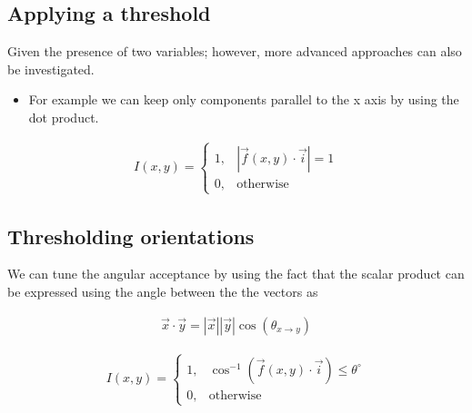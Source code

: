 \documentclass[letterpaper,10pt,english]{sphinxmanual}
\begin{document}
\noindent{}


\subsection{Applying a threshold}
\label{\detokenize{04-BasicSegmentation:applying-a-threshold}}
\sphinxAtStartPar
Given the presence of two variables; however, more advanced approaches can also be investigated.
\begin{itemize}
\item {} 
\sphinxAtStartPar
For example we can keep only components parallel to the x axis by using the dot product.

\end{itemize}
\begin{equation*}
\begin{split}I(x,y)=
\begin{cases}
1,&|\vec{f}(x,y)\cdot{}\vec{i}|=1\\
0,&\text{otherwise}
\end{cases}\end{split}
\end{equation*}

\subsection{Thresholding orientations}
\label{\detokenize{04-BasicSegmentation:thresholding-orientations}}
\sphinxAtStartPar
We can tune the angular acceptance by using the fact that the scalar product can be expressed using the angle between the the vectors as

\sphinxAtStartPar
{}
\begin{equation*}
\begin{split}\vec{x}\cdot\vec{y}=|\vec{x}| |\vec{y}| \cos(\theta_{x\rightarrow y}) \end{split}
\end{equation*}

\begin{equation*}
\begin{split}I(x,y)=
\begin{cases}
1,&\cos^{-1}(\vec{f}(x,y)\cdot \vec{i}) \leq \theta^{\circ} \\
0,&\text{otherwise}
\end{cases}\end{split}
\end{equation*}
\end{document}
